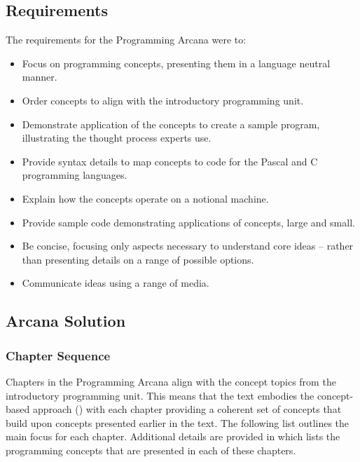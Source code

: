 \subsection{Requirements} %
\label{sub:arcana_requirements}

The requirements for the Programming Arcana were to:
\begin{itemize}[noitemsep,nolistsep]
  \item Focus on programming concepts, presenting them in a language neutral manner.
  \item Order concepts to align with the introductory programming unit.
  \item Demonstrate application of the concepts to create a sample program, illustrating the thought process experts use.
  \item Provide syntax details to map concepts to code for the Pascal and C programming languages.
  \item Explain how the concepts operate on a notional machine.
  \item Provide sample code demonstrating applications of concepts, large and small.
  \item Be concise, focusing only aspects necessary to understand core ideas -- rather than presenting details on a range of possible options.
  \item Communicate ideas using a range of media.
\end{itemize}


\subsection{Arcana Solution} %
\label{sub:arcana_solution}

\subsubsection{Chapter Sequence} %
\label{ssub:chapter_sequence}

Chapters in the Programming Arcana align with the concept topics from the introductory programming unit. This means that the text embodies the concept-based approach () with each chapter providing a coherent set of concepts that build upon concepts presented earlier in the text. The following list outlines the main focus for each chapter. Additional details are provided in  which lists the programming concepts that are presented in each of these chapters.

